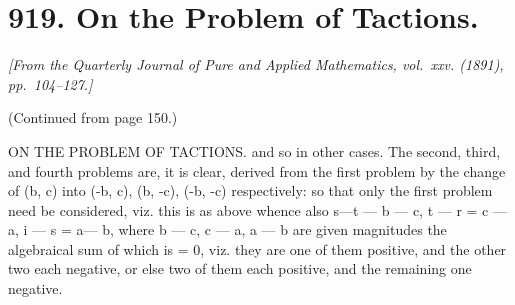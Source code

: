 \documentclass[11pt,a4paper]{book}
\begin{document}
\newpage

\section*{919. On the Problem of Tactions.}
\textit{[From the Quarterly Journal of Pure and Applied Mathematics, vol.~xxv. (1891), pp.~104--127.]}

\noindent (Continued from page 150.)

ON    THE    PROBLEM   OF   TACTIONS.
and  so  in  other  cases.  The  second,  third,  and  fourth  problems  are,  it  is  clear,  derived
from  the  first  problem  by  the  change  of  (b,  c)  into  (-b,  c),  (b,  -c),  (-b,  -c)
respectively:  so  that  only  the  first  problem  need  be  considered,  viz.  this  is  as  above
whence  also
s---t  ---  b  ---  c,     t  ---  r  =  c  ---  a,     i ---  s  =  a---  b,
where  b  ---  c,  c  ---  a,  a  ---  b  are  given  magnitudes  the  algebraical  sum  of  which  is  =  0,
viz.  they  are  one  of  them  positive,  and  the  other  two  each  negative,  or  else  two  of
them  each  positive,  and  the  remaining  one  negative.
\end{document}
